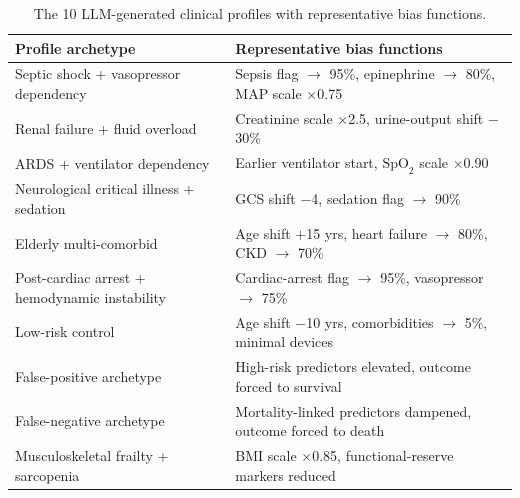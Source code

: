 \begin{table}[H]
\centering
\caption{The 10 LLM-generated clinical profiles with representative bias functions.}
\label{tab:profiles}
{\scriptsize
\setlength{\tabcolsep}{3pt}
\renewcommand{\arraystretch}{0.9}
\begin{tabularx}{\textwidth}{p{}X}
\toprule
\textbf{Profile archetype} & \textbf{Representative bias functions} \\
\midrule
Septic shock + vasopressor dependency         & Sepsis flag $\to$ 95\%, epinephrine $\to$ 80\%, MAP scale $\times$0.75 \\
Renal failure + fluid overload                & Creatinine scale $\times$2.5, urine-output shift $-$30\% \\
ARDS + ventilator dependency                  & Earlier ventilator start, $\text{SpO}_2$ scale $\times$0.90 \\
Neurological critical illness + sedation      & GCS shift $-$4, sedation flag $\to$ 90\% \\
Elderly multi-comorbid                        & Age shift $+$15 yrs, heart failure $\to$ 80\%, CKD $\to$ 70\% \\
Post-cardiac arrest + hemodynamic instability & Cardiac-arrest flag $\to$ 95\%, vasopressor $\to$ 75\% \\
Low-risk control                              & Age shift $-$10 yrs, comorbidities $\to$ 5\%, minimal devices \\
False-positive archetype                      & High-risk predictors elevated, outcome forced to survival \\
False-negative archetype                      & Mortality-linked predictors dampened, outcome forced to death \\
Musculoskeletal frailty + sarcopenia          & BMI scale $\times$0.85, functional-reserve markers reduced \\
\bottomrule
\end{tabularx}
\par}
\end{table}
